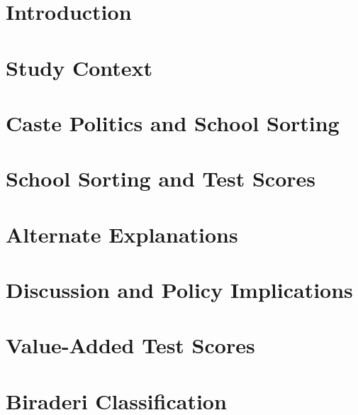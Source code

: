 \documentclass[11pt]{article}
\begin{document}
\section{Introduction}\label{pk_intro}

	

\section{Study Context}\label{pk_context}

	

\section{Caste Politics and School Sorting}\label{pk_sorting} %

	


\section{School Sorting and Test Scores}\label{pk_scores}

	


\section{Alternate Explanations}\label{pk_alternatives}

	

\section{Discussion and Policy Implications}\label{pk_conclusion}

	



\pagebreak

	
	

\appendix

\section{Value-Added Test Scores}\label{appendix_valueadded}

	
\clearpage
\section{Biraderi Classification}\label{appendix_classification}

	
\end{document}
